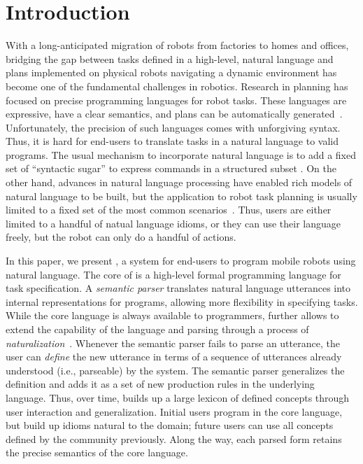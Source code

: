 \section{Introduction}

With a long-anticipated migration of robots from factories to homes and offices, bridging
the gap between tasks defined in a high-level, natural language and plans
implemented on physical robots navigating a dynamic environment has become one
of the fundamental challenges in robotics.
%
Research in planning has focused on precise programming languages for robot tasks.
These languages are expressive, have a clear semantics,
and plans can be automatically generated~\cite{golog, strips, pddl,fainekosTemporalLogicMotionPlanning,hoffmanFF,ankushDrona}.
Unfortunately, the precision of such languages comes with unforgiving syntax.
Thus, it is hard for end-users to translate tasks in a natural language to valid programs.
The usual mechanism to incorporate natural language is to add a fixed set of ``syntactic sugar'' to express
commands in a structured subset \cite{hadasTranslatingStructuredEnglish}.
On the other hand, advances in natural language processing have enabled rich models of natural
language to be built, but the application to robot task planning is usually
limited to a fixed set of the most common scenarios~\cite{hadasProvablyCorrectReactiveControlFromNaturalLanguage,thomasonDialog,kollarDialog}.
Thus, users are either limited to a handful of natual language idioms,
or they can use their language freely, but the robot can only do a handful of actions.

In this paper, we present \tool, a system for end-users to program mobile robots using natural language.
The core of \tool is a high-level formal programming language for task specification.
A \emph{semantic parser} \cite{berantSempre} translates natural language utterances into internal representations for programs,
allowing more flexibility in specifying tasks.
While the core language is always available to programmers,
\tool further allows to extend the capability of the language and parsing through a
process of \emph{naturalization}~\cite{wangVoxelurn}.
Whenever the semantic parser fails to parse an utterance, the user can \emph{define} the
new utterance in terms of a sequence of utterances already understood (i.e., parseable) by the system.
The semantic parser generalizes the definition and adds it as a set of new production rules in the underlying language.
Thus, over time, \tool builds up a large lexicon of defined concepts through user interaction and generalization.
Initial users program in the core language, but build up idioms natural to the domain; future users
can use all concepts defined by the community previously.
Along the way, each parsed form retains the precise semantics of the core language.

